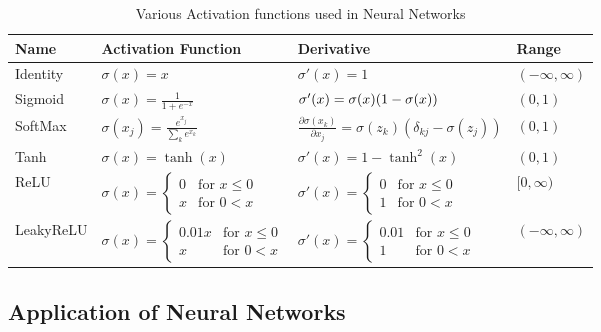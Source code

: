 \documentclass[reprint, english, nofootinbib]{revtex4-2}
\begin{document}
\begin{table}[]
\caption{\label{tab: activation functions}Various Activation functions used in Neural Networks}
\setlength{\tabcolsep}{20pt}
\renewcommand{\arraystretch}{2.5}
\begin{tabular}{llll}
    Name & Activation Function & Derivative & Range \\
    \hline\hline
    Identity &
    $\sigma(x) = x$  &
    $\sigma'(x) = 1$ &
    $(-\infty, \infty)$
    \\ \hline
    Sigmoid &
    $\sigma(x) = \frac{1}{1 + e^{-x}}$  &
    $\sigma'(x) =\sigma(x)\qty(1-\sigma(x))$ &
    $(0, 1)$
    \\ \hline
    SoftMax &
    $\sigma(x_j) = \frac{e^{x_j}}{\sum_k e^{x_k}}$  &
    $\frac{\partial \sigma(x_k)}{\partial x_j} = \sigma(z_k) (\delta_{kj} - \sigma(z_j))$ &
    $(0, 1)$
    \\ \hline
    Tanh &
    $\sigma(x) = \tanh(x)$  &
    $\sigma'(x) =  1 - \tanh^2(x)$ &
    $(0, 1)$
    \\ \hline
    ReLU    &
    $\sigma(x) = \left\{\begin{matrix}0 & \text{for } x \leq 0 \\ x & \text{for } 0 < x\end{matrix}\right.$ &
    $\sigma'(x) = \left\{\begin{matrix}0 & \text{for } x \leq 0 \\ 1 & \text{for } 0 < x\end{matrix}\right.$ &
    $[0, \infty)$
    \\ \hline
    LeakyReLU &
    $\sigma(x) = \left\{\begin{matrix}0.01x & \text{for } x \leq 0 \\ x & \text{for } 0 < x\end{matrix}\right.$ &
    $\sigma'(x) = \left\{\begin{matrix}0.01 & \text{for } x \leq 0 \\ 1 & \text{for } 0 < x\end{matrix}\right.$ &
    $(-\infty, \infty)$
    \\ \hline
\end{tabular}
\end{table}



\subsection{Application of Neural Networks}
\end{document}
